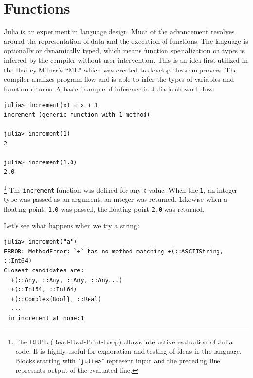 \section{Functions}
Julia is an experiment in language design. Much of the advancement
revolves around the representation of data and the execution of functions.
The language is optionally or dynamically typed, which means function specialization on types
is inferred by the compiler without user intervention. This is an idea
first utilized in the Hadley Milner's ``ML" which was created to develop theorem
provers\cite{Harper_1997}. The compiler analizes program flow and is able
to infer the types of variables and function returns.
A basic example of inference in Julia is shown below:
\begin{lstlisting}
julia> increment(x) = x + 1
increment (generic function with 1 method)

julia> increment(1)
2

julia> increment(1.0)
2.0
\end{lstlisting}\footnote{The REPL (Read-Eval-Print-Loop) allows interactive
evaluation of Julia code. It is highly useful for exploration and testing of
ideas in the language.
Blocks starting with "\texttt{julia>}" represent input and the preceding
line represents output of the evaluated line.
}
The \texttt{increment} function was defined for any \texttt{x} value. When the
\texttt{1}, an
integer type was passed as an argument, an integer was returned. Likewise
when a floating point, \texttt{1.0} was passed, the floating point
\texttt{2.0} was returned.

Let's see what happens when we try a string:
\begin{lstlisting}
julia> increment("a")
ERROR: MethodError: `+` has no method matching +(::ASCIIString, ::Int64)
Closest candidates are:
  +(::Any, ::Any, ::Any, ::Any...)
  +(::Int64, ::Int64)
  +(::Complex{Bool}, ::Real)
  ...
 in increment at none:1
\end{lstlisting}


